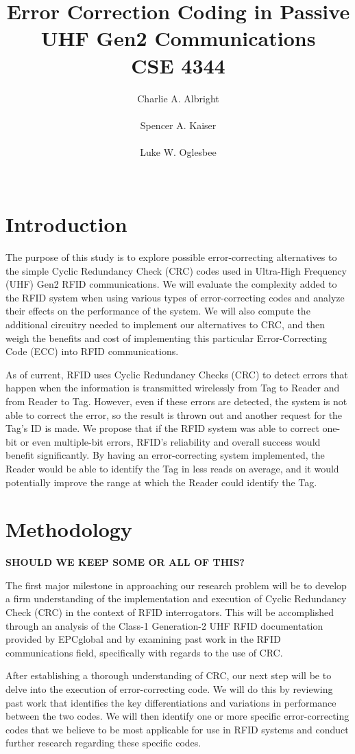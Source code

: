 \documentclass{sigcomm-alternate}
\title{
Error Correction Coding in Passive UHF Gen2 Communications\\
{\large CSE 4344}
}
\author{
\alignauthor Charlie A. Albright\\
\affaddr{Computer Science and Engineering Department\\
 	Southern Methodist University\\
	Dallas, Texas USA}\\
\email{calbright@smu.edu}
%
\alignauthor Spencer A. Kaiser\\
\affaddr{Computer Science and Engineering Department\\
 	Southern Methodist University\\
	Dallas, Texas USA}\\
\email{skaiser@smu.edu}
%
\alignauthor Luke W. Oglesbee\\
\affaddr{Computer Science and Engineering Department\\
 	Southern Methodist University\\
	Dallas, Texas USA}\\
\email{loglesbee@smu.edu}
}
\begin{document}
\maketitle

\section{Introduction}
The purpose of this study is to explore possible error-correcting alternatives to the simple Cyclic Redundancy Check (CRC) codes used in Ultra-High Frequency (UHF) Gen2 RFID communications. We will evaluate the complexity added to the RFID system when using various types of error-correcting codes and analyze their effects on the performance of the system. We will also compute the additional circuitry needed to implement our alternatives to CRC, and then weigh the benefits and cost of implementing this particular Error-Correcting Code (ECC) into RFID communications.

As of current, RFID uses Cyclic Redundancy Checks (CRC) to detect errors that happen when the information is transmitted wirelessly from Tag to Reader and from Reader to Tag. However, even if these errors are detected, the system is not able to correct the error, so the result is thrown out and another request for the Tag's ID is made. We propose that if the RFID system was able to correct one-bit or even multiple-bit errors, RFID's reliability and overall success would benefit significantly. By having an error-correcting system implemented, the Reader would be able to identify the Tag in less reads on average, and it would potentially improve the range at which the Reader could identify the Tag.

\section{Methodology}
\textbf{SHOULD WE KEEP SOME OR ALL OF THIS?}

The first major milestone in approaching our research problem will be to develop a firm understanding of the implementation and execution of Cyclic Redundancy Check (CRC) in the context of RFID interrogators. This will be accomplished through an analysis of the Class-1 Generation-2 UHF RFID documentation provided by EPCglobal and by examining past work in the RFID communications field, specifically with regards to the use of CRC.
	
After establishing a thorough understanding of CRC, our next step will be to delve into the execution of error-correcting code. We will do this by reviewing past work that identifies the key differentiations and variations in performance between the two codes. We will then identify one or more specific error-correcting codes that we believe to be most applicable for use in RFID systems and conduct further research regarding these specific codes. 
\end{document}
